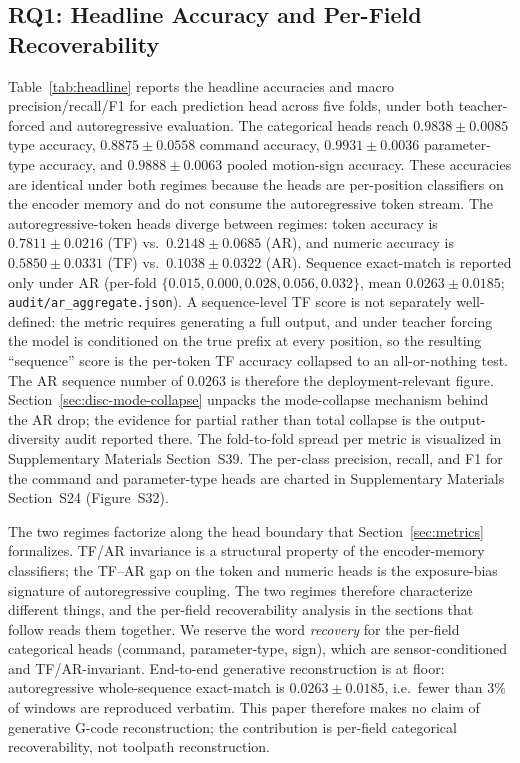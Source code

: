 \documentclass[sensors,article,submit,moreauthors,pdftex]{Definitions/mdpi}
\begin{document}
\subsection{RQ1: Headline Accuracy and Per-Field Recoverability}
\label{sec:results-headline}

Table~\ref{tab:headline} reports the headline accuracies and macro precision/recall/F1 for each prediction head across five folds, under both teacher-forced and autoregressive evaluation. The categorical heads reach $0.9838 \pm 0.0085$ type accuracy, $0.8875 \pm 0.0558$ command accuracy, $0.9931 \pm 0.0036$ parameter-type accuracy, and $0.9888 \pm 0.0063$ pooled motion-sign accuracy. These accuracies are identical under both regimes because the heads are per-position classifiers on the encoder memory and do not consume the autoregressive token stream. The autoregressive-token heads diverge between regimes: token accuracy is $0.7811 \pm 0.0216$ (TF) vs.\ $0.2148 \pm 0.0685$ (AR), and numeric accuracy is $0.5850 \pm 0.0331$ (TF) vs.\ $0.1038 \pm 0.0322$ (AR). Sequence exact-match is reported only under AR (per-fold $\{0.015, 0.000, 0.028, 0.056, 0.032\}$, mean $0.0263 \pm 0.0185$; \texttt{audit/ar\_aggregate.json}). A sequence-level TF score is not separately well-defined: the metric requires generating a full output, and under teacher forcing the model is conditioned on the true prefix at every position, so the resulting ``sequence'' score is the per-token TF accuracy collapsed to an all-or-nothing test. The AR sequence number of $0.0263$ is therefore the deployment-relevant figure. Section~\ref{sec:disc-mode-collapse} unpacks the mode-collapse mechanism behind the AR drop; the evidence for partial rather than total collapse is the output-diversity audit reported there. The fold-to-fold spread per metric is visualized in Supplementary Materials Section~S39. The per-class precision, recall, and F1 for the command and parameter-type heads are charted in Supplementary Materials Section~S24 (Figure~S32).

The two regimes factorize along the head boundary that Section~\ref{sec:metrics} formalizes. TF/AR invariance is a structural property of the encoder-memory classifiers; the TF--AR gap on the token and numeric heads is the exposure-bias signature of autoregressive coupling. The two regimes therefore characterize different things, and the per-field recoverability analysis in the sections that follow reads them together. We reserve the word \emph{recovery} for the per-field categorical heads (command, parameter-type, sign), which are sensor-conditioned and TF/AR-invariant. End-to-end generative reconstruction is at floor: autoregressive whole-sequence exact-match is $0.0263 \pm 0.0185$, i.e.\ fewer than $3\%$ of windows are reproduced verbatim. This paper therefore makes no claim of generative G-code reconstruction; the contribution is per-field categorical recoverability, not toolpath reconstruction.
\end{document}
